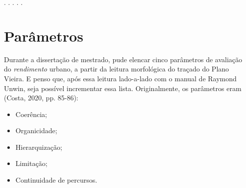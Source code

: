 \documentclass[12pt, a4paper]{book} %
\begin{document}
        \begin{center}
            . . . . .
        \end{center} 



            \section{Parâmetros}

        Durante a dissertação de mestrado, pude elencar cinco parâmetros de avaliação do \textit{rendimento} urbano, a partir da leitura morfológica do traçado do Plano Vieira. E penso que, após essa leitura lado-a-lado com o manual de Raymond Unwin, seja possível incrementar essa lista. Originalmente, os parâmetros eram (Costa, 2020, pp. 85-86):

        \begin{itemize}
            \item Coerência;
            \item Organicidade;
            \item Hierarquização;
            \item Limitação;
            \item Continuidade de percursos.
        \end{itemize}
\end{document}
